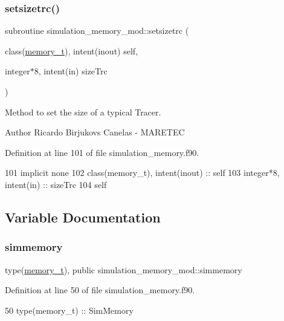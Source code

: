 \subsubsection{\texorpdfstring{setsizetrc()}{setsizetrc()}}
{\footnotesize\ttfamily subroutine simulation\+\_\+memory\+\_\+mod\+::setsizetrc (\begin{DoxyParamCaption}\item[{class(\mbox{\hyperlink{structsimulation__memory__mod_1_1memory__t}{memory\+\_\+t}}), intent(inout)}]{self,  }\item[{integer$\ast$8, intent(in)}]{size\+Trc }\end{DoxyParamCaption})\hspace{0.3cm}{\ttfamily [private]}}



Method to set the size of a typical Tracer. 

\begin{DoxyAuthor}{Author}
Ricardo Birjukovs Canelas -\/ M\+A\+R\+E\+T\+EC 
\end{DoxyAuthor}


Definition at line 101 of file simulation\+\_\+memory.\+f90.


\begin{DoxyCode}
101     \textcolor{keywordtype}{implicit none}
102     \textcolor{keywordtype}{class}(memory\_t), \textcolor{keywordtype}{intent(inout)} :: self
103     \textcolor{keywordtype}{integer*8}, \textcolor{keywordtype}{intent(in)} :: sizeTrc
104     self%
\end{DoxyCode}


\subsection{Variable Documentation}
\mbox{\label{namespacesimulation__memory__mod_af3e2714796469b4b1ec247569b184088}} 
\subsubsection{\texorpdfstring{simmemory}{simmemory}}
{\footnotesize\ttfamily type(\mbox{\hyperlink{structsimulation__memory__mod_1_1memory__t}{memory\+\_\+t}}), public simulation\+\_\+memory\+\_\+mod\+::simmemory}



Definition at line 50 of file simulation\+\_\+memory.\+f90.


\begin{DoxyCode}
50     \textcolor{keywordtype}{type}(memory\_t) :: SimMemory
\end{DoxyCode}
